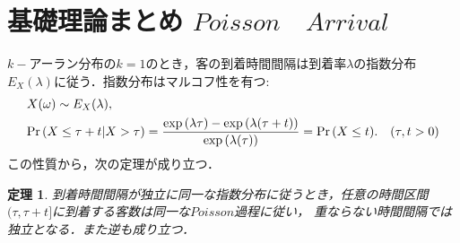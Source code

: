 \documentclass[a4j,papersize,disablejfam,slide,14pt]{jsarticle}
\newtheorem{Prop}{定理}
\def\exp#1{\mbox{${\rm exp} \left( #1 \right)$}} %
\def\prob#1{\mbox{${\rm Pr} \left( #1 \right)$}} %
\def\cprob#1#2{\mbox{${\rm Pr} \left( #1 | #2 \right)$}} %
\begin{document}
\section{基礎理論まとめ \qquad $Poisson\quad Arrival$}
	$k-$アーラン分布の$k = 1$のとき，客の到着時間間隔は到着率$\lambda$の指数分布$E_X(\lambda)$に従う．指数分布はマルコフ性を有つ:
    \begin{eqnarray}
    	&X(\omega) \sim E_X(\lambda),\\
    	&\cprob{X \leq \tau+t}{X > \tau} = \frac{\exp{\lambda \tau} - \exp{\lambda (\tau+t)}}{\exp{\lambda (\tau)}} = \prob{X \leq t}. \quad (\tau,t > 0)
    \end{eqnarray}
    この性質から，次の定理が成り立つ．
    \begin{screen}
    	\begin{Prop}
    		到着時間間隔が独立に同一な指数分布に従うとき，任意の時間区間$(\tau, \tau + t]$に到着する客数は同一な$Poisson$過程に従い，
    		重ならない時間間隔では独立となる．また逆も成り立つ．
        \end{Prop}
    \end{screen}
\end{document}
